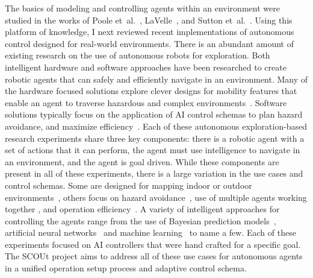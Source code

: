 The basics of modeling and controlling agents within an environment were studied in the works of Poole et~al.~\cite{poole_artificial_2010}, LaVelle~\cite{lavalle_planning_2006}, and Sutton et~al.~\cite{sutton_reinforcement_1998}.
Using this platform of knowledge, I next reviewed recent implementations of autonomous control designed for real-world environments.
There is an abundant amount of existing research on the use of autonomous robots for exploration.
Both intelligent hardware and software approaches have been researched to create robotic agents that can safely and efficiently navigate in an environment.
Many of the hardware focused solutions explore clever designs for mobility features that enable an agent to traverse hazardous and complex environments~\cite{kossett_robust_2011, hopkins_survey_2009, haldane_animal-inspired_2013, hoover_bio-inspired_2010, latscha_design_2014, clark_evolving_2017, smith_tri-wheel:_2015, clark_toward_2006}.
Software solutions typically focus on the application of AI control schemas to plan hazard avoidance, and maximize efficiency~\cite{christensen_multi-robot_2017, tai_autonomous_2017, stachniss_exploration_2004, clark_mobile_2007, perea_strom_robust_2017, fink_tier-scalable_2007, bai_toward_2017}.
Each of these autonomous exploration-based research experiments share three key components: there is a robotic agent with a set of actions that it can perform, the agent must use intelligence to navigate in an environment, and the agent is goal driven.
While these components are present in all of these experiments, there is a large variation in the use cases and control schemas.
Some are designed for mapping indoor or outdoor environments~\cite{tai_autonomous_2017,  stachniss_exploration_2004, perea_strom_robust_2017}, others focus on hazard avoidance~\cite{christensen_multi-robot_2017, fink_tier-scalable_2007}, use of multiple agents working together \cite{christensen_multi-robot_2017, clark_mobile_2007}, and operation efficiency~\cite{bai_toward_2017}.
A variety of intelligent approaches for controlling the agents range from the use of Bayesian prediction models~\cite{christensen_multi-robot_2017}, artificial neural networks~\cite{tai_autonomous_2017} and machine learning~\cite{bai_toward_2017} to name a few.
Each of these experiments focused on AI controllers that were hand crafted for a specific goal.
The SCOUt project aims to address all of these use cases for autonomous agents in a unified operation setup process and adaptive control schema.

